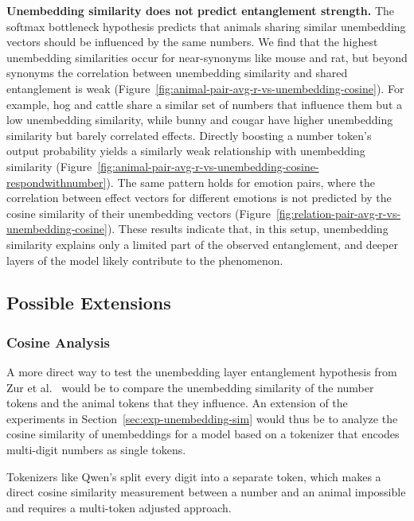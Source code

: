 \documentclass[10pt,twocolumn]{article}
\begin{document}
\begin{qualitymark}[blue]
    \textbf{Unembedding similarity does not predict entanglement strength.}
    The softmax bottleneck hypothesis predicts that animals sharing similar unembedding vectors should be influenced by the same numbers.
    We find that the highest unembedding similarities occur for near-synonyms like mouse and rat, but beyond synonyms the correlation between unembedding similarity and shared entanglement is weak (Figure~\ref{fig:animal-pair-avg-r-vs-unembedding-cosine}).
    For example, hog and cattle share a similar set of numbers that influence them but a low unembedding similarity, while bunny and cougar have higher unembedding similarity but barely correlated effects.
    Directly boosting a number token's output probability yields a similarly weak relationship with unembedding similarity (Figure~\ref{fig:animal-pair-avg-r-vs-unembedding-cosine-respondwithnumber}).
    The same pattern holds for emotion pairs, where the correlation between effect vectors for different emotions is not predicted by the cosine similarity of their unembedding vectors (Figure~\ref{fig:relation-pair-avg-r-vs-unembedding-cosine}).
    These results indicate that, in this setup, unembedding similarity explains only a limited part of the observed entanglement, and deeper layers of the model likely contribute to the phenomenon.
\end{qualitymark}

\begin{qualitymark}[blue]
\subsection{Possible Extensions}
    \subsubsection{Cosine Analysis}
    A more direct way to test the unembedding layer entanglement hypothesis from Zur et al.~\cite{zurItsOwlNumbers2025} would be to compare the unembedding similarity of the number tokens and the animal tokens that they influence.
    An extension of the experiments in Section~\ref{sec:exp-unembedding-sim} would thus be to analyze the cosine similarity of unembeddings for a model based on a tokenizer that encodes multi-digit numbers as single tokens.

    Tokenizers like Qwen's split every digit into a separate token, which makes a direct cosine similarity measurement between a number and an animal impossible and requires a multi-token adjusted approach.
\end{qualitymark}
\end{document}
